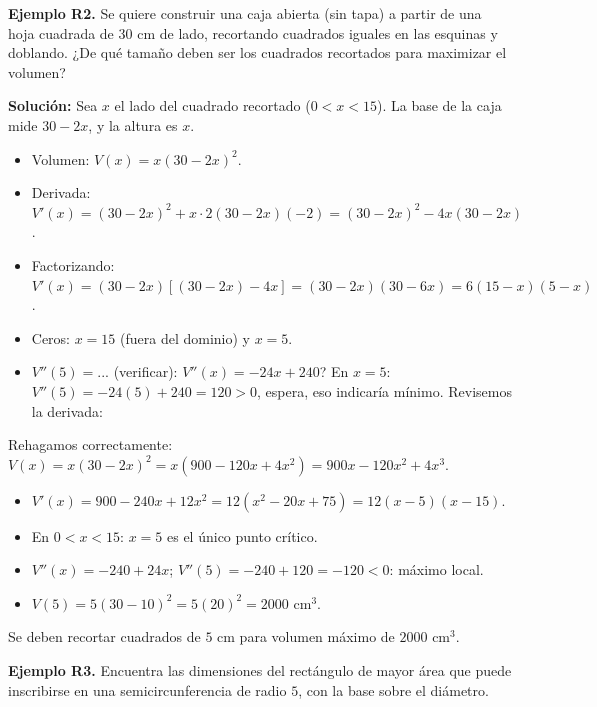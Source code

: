 \documentclass[12pt, a4paper]{article}
\begin{document}
\textbf{Ejemplo R2.} Se quiere construir una caja abierta (sin tapa) a partir de una hoja cuadrada de $30$ cm de lado, recortando cuadrados iguales en las esquinas y doblando. ¿De qué tamaño deben ser los cuadrados recortados para maximizar el volumen?

\begin{cuadrosolucion}
  \textbf{Solución:} Sea $x$ el lado del cuadrado recortado ($0 < x < 15$). La base de la caja mide $30 - 2x$, y la altura es $x$.
  \begin{itemize}
    \item Volumen: $V(x) = x(30 - 2x)^2$.
    \item Derivada: $V'(x) = (30 - 2x)^2 + x \cdot 2(30 - 2x)(-2) = (30 - 2x)^2 - 4x(30 - 2x)$.
    \item Factorizando: $V'(x) = (30 - 2x)[(30 - 2x) - 4x] = (30 - 2x)(30 - 6x) = 6(15 - x)(5 - x)$.
    \item Ceros: $x = 15$ (fuera del dominio) y $x = 5$.
    \item $V''(5) = ...$ (verificar): $V''(x) = -24x + 240$? En $x = 5$: $V''(5) = -24(5) + 240 = 120 > 0$, espera, eso indicaría mínimo. Revisemos la derivada:
  \end{itemize}

  Rehagamos correctamente: $V(x) = x(30 - 2x)^2 = x(900 - 120x + 4x^2) = 900x - 120x^2 + 4x^3$.
  \begin{itemize}
    \item $V'(x) = 900 - 240x + 12x^2 = 12(x^2 - 20x + 75) = 12(x - 5)(x - 15)$.
    \item En $0 < x < 15$: $x = 5$ es el único punto crítico.
    \item $V''(x) = -240 + 24x$; $V''(5) = -240 + 120 = -120 < 0$: máximo local.
    \item $V(5) = 5(30 - 10)^2 = 5(20)^2 = 2000$ cm$^3$.
  \end{itemize}
  Se deben recortar cuadrados de $5$ cm para volumen máximo de $2000$ cm$^3$.
\end{cuadrosolucion}

\textbf{Ejemplo R3.} Encuentra las dimensiones del rectángulo de mayor área que puede inscribirse en una semicircunferencia de radio $5$, con la base sobre el diámetro.
\end{document}

